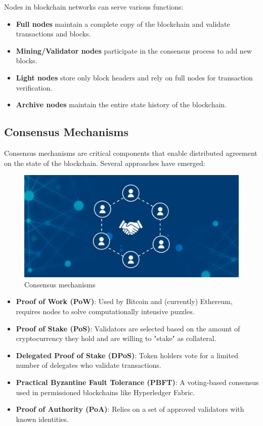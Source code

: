 \documentclass[twoside]{article}
\begin{document}
Nodes in blockchain networks can serve various functions:
\begin{itemize}
  \item \textbf{Full nodes} maintain a complete copy of the blockchain and validate transactions and blocks.
  \item \textbf{Mining/Validator nodes} participate in the consensus process to add new blocks.
  \item \textbf{Light nodes} store only block headers and rely on full nodes for transaction verification.
  \item \textbf{Archive nodes} maintain the entire state history of the blockchain.
\end{itemize}

\subsection{Consensus Mechanisms}
Consensus mechanisms are critical components that enable distributed agreement on the state of the blockchain. Several approaches have emerged:

\begin{figure}[H]
  \centering
  \includegraphics[width=1\textwidth]{imgs/conseuns.jpeg}
  \caption{Consensus mechanisms}
  \label{fig:2}
\end{figure}

\begin{itemize}
  \item \textbf{Proof of Work (PoW)}: Used by Bitcoin and (currently) Ethereum, requires nodes to solve computationally intensive puzzles.
  \item \textbf{Proof of Stake (PoS)}: Validators are selected based on the amount of cryptocurrency they hold and are willing to "stake" as collateral.
  \item \textbf{Delegated Proof of Stake (DPoS)}: Token holders vote for a limited number of delegates who validate transactions.
  \item \textbf{Practical Byzantine Fault Tolerance (PBFT)}: A voting-based consensus used in permissioned blockchains like Hyperledger Fabric.
  \item \textbf{Proof of Authority (PoA)}: Relies on a set of approved validators with known identities.
\end{itemize}
\end{document}

